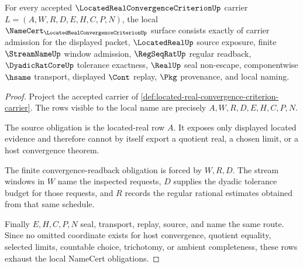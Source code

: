 \begin{theorem}
\label{thm:located-real-convergence-criterion-namecert-obligations}
For every accepted $\LocatedRealConvergenceCriterionUp$ carrier $L=(A,W,R,D,E,H,C,P,N)$, the local $\NameCert_{\LocatedRealConvergenceCriterionUp}$ surface consists exactly of carrier admission for the displayed packet, $\LocatedRealUp$ source exposure, finite $\StreamNameUp$ window admission, $\RegSeqRatUp$ regular readback, $\DyadicRatCoreUp$ tolerance exactness, $\RealUp$ seal non-escape, componentwise $\hsame$ transport, displayed $\Cont$ replay, $\Pkg$ provenance, and local naming.
\end{theorem}
\begin{proof}
Project the accepted carrier of \autoref{def:located-real-convergence-criterion-carrier}. The rows visible to the local name are precisely $A,W,R,D,E,H,C,P,N$.

The source obligation is the located-real row $A$. It exposes only displayed located evidence and therefore cannot by itself export a quotient real, a chosen limit, or a host convergence theorem.

The finite convergence-readback obligation is forced by $W,R,D$. The stream windows in $W$ name the inspected requests, $D$ supplies the dyadic tolerance budget for those requests, and $R$ records the regular rational estimates obtained from that same schedule.

Finally $E,H,C,P,N$ seal, transport, replay, source, and name the same route. Since no omitted coordinate exists for host convergence, quotient equality, selected limits, countable choice, trichotomy, or ambient completeness, these rows exhaust the local NameCert obligations.
\end{proof}

